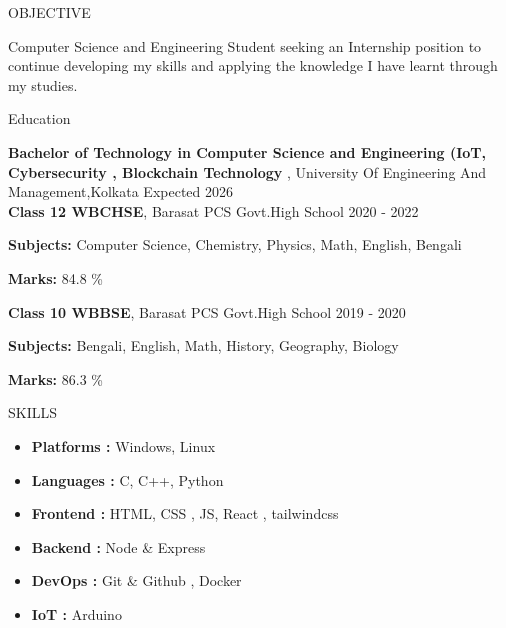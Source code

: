 \documentclass{resume} %
\begin{document}

\begin{rSection}{OBJECTIVE}

{Computer Science and Engineering Student seeking an Internship position to continue developing my skills and applying the knowledge I have learnt through my studies.}


\end{rSection}

\begin{rSection}{Education}

{\bf Bachelor of Technology in Computer Science and Engineering (IoT, Cybersecurity , Blockchain Technology }, 
University Of Engineering And Management,Kolkata \hfill {Expected 2026}\\


{\bf Class 12 WBCHSE}, Barasat PCS Govt.High School \hfill {2020 - 2022}
\item \textbf{Subjects:} {Computer Science, Chemistry, Physics, Math, English, Bengali}
    \hspace{1cm} \item \textbf{Marks:}   {84.8 \%}


{\bf Class 10 WBBSE}, Barasat PCS Govt.High School \hfill {2019 - 2020}
 \item \textbf{Subjects:} {Bengali, English, Math, History, Geography, Biology}
     \item \textbf{Marks:} {86.3 \%}



\end{rSection}

\begin{rSection}{SKILLS}


\begin{itemize}
\item {\textbf{Platforms :} {Windows, Linux}}
\item{\textbf{Languages :}  {C, C++, Python }}
\item{\textbf{Frontend :} {HTML, CSS , JS, React , tailwindcss}}
\item{\textbf{Backend :} {Node \& Express}}
\item{\textbf{DevOps :} {Git \& Github , Docker}}
\item{\textbf{IoT :} {Arduino}}
\end{itemize}



\end{rSection}
\end{document}
